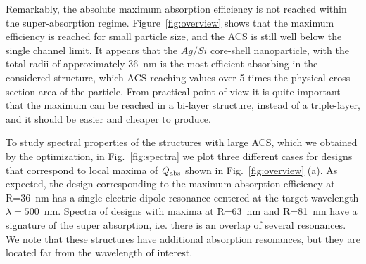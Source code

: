 \documentclass[aps,prl,twocolumn,showpacs,superscriptaddress,groupedaddress]{revtex4-1}
\begin{document}
Remarkably, the absolute maximum absorption efficiency is not reached
within the super-absorption regime. Figure~\ref{fig:overview} shows
that the maximum efficiency is reached for small particle size, and
the ACS is still well below the single channel limit. It appears that
the $Ag/Si$ core-shell nanoparticle, with the total radii of
approximately 36~nm is the most efficient absorbing in the considered
structure, which ACS reaching values over 5 times the physical
cross-section area of the particle.  From practical point of view it
is quite important that the maximum can be reached in a bi-layer
structure, instead of a triple-layer, and it should be easier and
cheaper to produce.

\begin{figure}
\end{figure}
%
To study spectral properties of the structures with large ACS, which
we obtained by the optimization, in Fig.~\ref{fig:spectra} we plot
three different cases for designs that correspond to local maxima of
$Q_{\rm abs}$ shown in Fig.~\ref{fig:overview} (a).  As expected, the
design corresponding to the maximum absorption efficiency at R=36~nm
has a single electric dipole resonance centered at the target
wavelength $\lambda=500$~nm. Spectra of designs with maxima at R=63~nm
and R=81~nm have a signature of the super absorption, i.e. there is an
overlap of several resonances.  We note that these structures have
additional absorption resonances, but they are located far from the
wavelength of interest.
\end{document}
